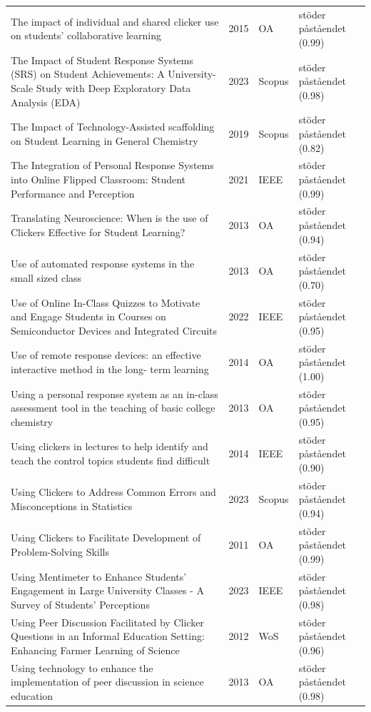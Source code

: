 \begin{longtable}{@{}%
  >{\raggedright\arraybackslash}p{}c%
  >{\raggedright\arraybackslash}p{}%
  >{\raggedright\arraybackslash}p{}@{}}
The impact of individual and shared clicker use on students' collaborative learning & 2015 & OA & stöder påståendet (0.99) \\
The Impact of Student Response Systems (SRS) on Student Achievements: A University-Scale Study with Deep Exploratory Data Analysis (EDA) & 2023 & Scopus & stöder påståendet (0.98) \\
The Impact of Technology-Assisted \textquotedbl{}scaffolding\textquotedbl{} on Student Learning in General Chemistry & 2019 & Scopus & stöder påståendet (0.82) \\
The Integration of Personal Response Systems into Online Flipped Classroom: Student Performance and Perception & 2021 & IEEE & stöder påståendet (0.99) \\
Translating Neuroscience: When is the use of Clickers Effective for Student Learning? & 2013 & OA & stöder påståendet (0.94) \\
Use of automated response systems in the small sized class & 2013 & OA & stöder påståendet (0.70) \\
Use of Online In-Class Quizzes to Motivate and Engage Students in Courses on Semiconductor Devices and Integrated Circuits & 2022 & IEEE & stöder påståendet (0.95) \\
Use of remote response devices: an effective interactive method in the long- term learning & 2014 & OA & stöder påståendet (1.00) \\
Using a personal response system as an in-class assessment tool in the teaching of basic college chemistry & 2013 & OA & stöder påståendet (0.95) \\
Using clickers in lectures to help identify and teach the control topics students find difficult & 2014 & IEEE & stöder påståendet (0.90) \\
Using Clickers to Address Common Errors and Misconceptions in Statistics & 2023 & Scopus & stöder påståendet (0.94) \\
Using Clickers to Facilitate Development of Problem-Solving Skills & 2011 & OA & stöder påståendet (0.99) \\
Using Mentimeter to Enhance Students' Engagement in Large University Classes - A Survey of Students' Perceptions & 2023 & IEEE & stöder påståendet (0.98) \\
Using Peer Discussion Facilitated by Clicker Questions in an Informal Education Setting: Enhancing Farmer Learning of Science & 2012 & WoS & stöder påståendet (0.96) \\
Using technology to enhance the implementation of peer discussion in science education & 2013 & OA & stöder påståendet (0.98) \\

\end{longtable}
